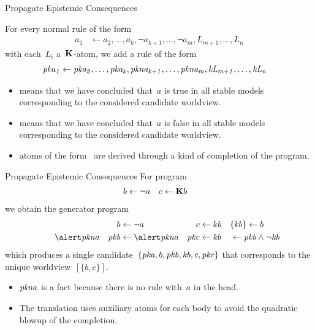 \documentclass[aspectratio=169,svgnames,xcolor=table,t]{beamer}
\begin{document}
\begin{frame}{Propagate Epistemic Consequences}
    \begin{myitemize}
        \item[] For every normal rule of the form
        \begin{align}
            a_1 &\leftarrow 
            a_2,\!\dotsc\!,a_k,
            \neg a_{k+1},\!\dotsc\!,\neg a_m,
            {L_{m+1}},\!\dotsc\!,{L_n}
        \end{align}
        with each~$L_i$ a~$\mathbf{K}$-atom, we add a rule of the form
        \begin{gather}
            \begin{aligned}
                \kp{a_1} &\span\span\leftarrow 
                \kp{a_2},\dotsc,\kp{a_k},
                \kpnott{a_{k+1}},\dotsc,\kpnott{a_m},
                \kk{L_{m+1}},\dotsc,\kk{L_n}
            \end{aligned}
        \end{gather}
        \vspace*{-15pt}
        \begin{itemize}
            \item {} means that we have concluded that~$a$ is true in all stable models corresponding to the considered candidate worldview.
            \item {} means that we have concluded that~$a$ is false in all stable models corresponding to the considered candidate worldview.
            \item atoms of the form~ are derived through a kind of completion of the program.
        \end{itemize}
    \end{myitemize}
\end{frame}
\begin{frame}{Propagate Epistemic Consequences}
    For program
    \begin{align*}
        b &\leftarrow \neg a
        &
        c &\leftarrow \mathbf{K} b
    \end{align*}
    we obtain the generator program
    \begin{align*}
        &&
        b &\leftarrow \neg a
        &
        c &\leftarrow kb
        &
        \{ \kk{b} \} &\leftarrow b
        \\
        \hi{\kpnott{a}}&
        &
        \kp{b} &\leftarrow \hi{\kpnott{a}}
        &
        \kp{c} &\leftarrow \kk{b}
        &&
        \mathrlap{\hspace{-16pt}\leftarrow \kp{b} \wedge \neg \kk{b}}
    \end{align*}
    which produces a single candidate~$\{\mathit{pka},b,\mathit{pkb},\mathit{kb},c,\mathit{pkc}\}$ that corresponds to the unique worldview~$[\{b,c\}]$.

    \begin{itemize}
        \item $\mathit{pkna}$ is a fact because there is no rule with~$a$ in the head.
        \item The translation uses auxiliary atoms for each body to avoid the quadratic blowup of the completion.
    \end{itemize}
\end{frame}
\end{document}
